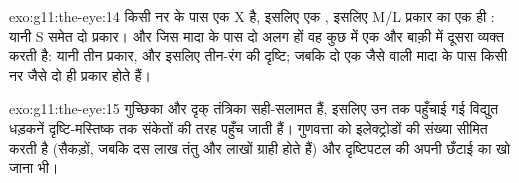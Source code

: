 \begin{solution}{exo:g11:the-eye:14}
किसी नर के पास एक X है, इसलिए एक , इसलिए M/L प्रकार का एक ही :
यानी S समेत दो प्रकार। और जिस मादा के पास दो अलग  हों वह कुछ 
में एक और बाक़ी में दूसरा व्यक्त करती है: यानी तीन प्रकार, और इसलिए तीन-रंग
की दृष्टि; जबकि दो एक जैसे  वाली मादा के पास किसी नर जैसे दो ही
प्रकार होते हैं।
\end{solution}

\begin{solution}{exo:g11:the-eye:15}
गुच्छिका  और दृक् तंत्रिका सही-सलामत हैं, इसलिए उन तक पहुँचाई गई
विद्युत धड़कनें दृष्टि-मस्तिष्क तक संकेतों की तरह पहुँच जाती हैं। गुणवत्ता
को इलेक्ट्रोडों की संख्या सीमित करती है (सैकड़ों, जबकि दस लाख तंतु और लाखों
ग्राही होते हैं) और दृष्टिपटल की अपनी छँटाई का खो जाना भी।
\end{solution}

